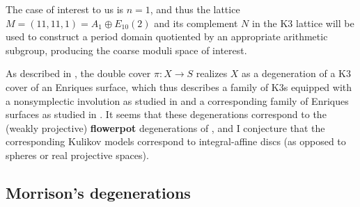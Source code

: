 \documentclass[../main.tex]{subfiles}
\begin{document}
\begin{remark}
The case of interest to us is $n=1$, and thus the lattice $M = (11, 11, 1) = A_1 \oplus E_{10}(2)$ and its complement $N$ in the K3 lattice will be used to construct a period domain quotiented by an appropriate arithmetic subgroup, producing the coarse moduli space of interest.
\end{remark}


\begin{remark}
As described in \cite{DZ99}, the double cover $\pi: X\to S$ realizes $X$ as a degeneration of a K3 cover of an Enriques surface, which thus describes a family of K3s equipped with a nonsymplectic involution as studied in \cite{AE22} and a corresponding family of Enriques surfaces as studied in \cite{AEGS23}.
It seems that these degenerations correspond to the (weakly projective) \textbf{flowerpot} degenerations of \cite{Mor81}, and I conjecture that the corresponding Kulikov models correspond to integral-affine discs (as opposed to spheres or real projective spaces).
\end{remark}


\subsection{Morrison's degenerations}

\end{document}
